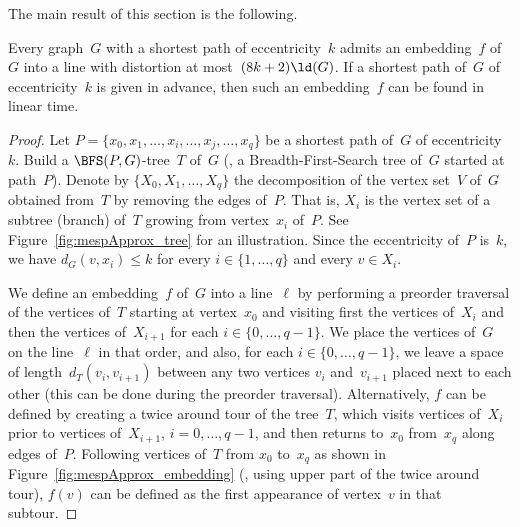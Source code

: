 The main result of this section is the following.

\begin{theorem}
    \label{theo:ldApprox}
Every graph~\( G \) with a shortest path of eccentricity~\( k \) admits an embedding~\( f \) of~\( G \) into a line with distortion at most~\( (8k + 2) \ld(G) \).
If a shortest path of~\( G \) of eccentricity~\( k \) is given in advance, then such an embedding~\( f \) can be found in linear time.
\end{theorem}

\begin{proof}
Let $P = \{ x_0, x_1, \ldots, x_i, \ldots, x_j, \ldots, x_q \}$ be a shortest path of~$G$ of eccentricity~$k$.
Build a $\BFS(P,G)$-tree~$T$ of~$G$ (\ie, a Breadth-First-Search tree of~$G$ started at path~$P$).
Denote by $\{ X_0, X_1, \ldots, X_q \}$ the decomposition of the vertex set~$V$ of~$G$ obtained from~$T$ by removing the edges of~$P$.
That is, $X_i$ is the vertex set of a subtree (branch) of~$T$ growing from vertex~$x_i$ of~$P$.
See Figure~\ref{fig:mespApprox_tree} for an illustration.
Since the eccentricity of~$P$ is~$k$, we have $d_G(v, x_i) \leq k$ for every $i \in \{ 1, \ldots, q \}$ and every $v \in X_i$.

We define an embedding~$f$ of~$G$ into a line~$\ell$ by performing a preorder traversal of the vertices of~$T$ starting at vertex~$x_0$ and visiting first the vertices of~$X_i$ and then the vertices of~$X_{i + 1}$ for each $i \in \{ 0, \ldots, q - 1 \}$.
We place the vertices of~$G$ on the line~$\ell$ in that order, and also, for each $i \in \{ 0, \ldots, q - 1 \}$, we leave a space of length~$d_T(v_i, v_{i+1})$ between any two vertices $v_i$ and~$v_{i+1}$ placed next to each other (this can be done during the preorder traversal).
Alternatively, $f$ can be defined by creating a twice around tour of the tree~$T$, which visits vertices of~$X_i$ prior to vertices of~$X_{i+1}$, $i = 0, \ldots, q - 1$, and then returns to~$x_0$ from~$x_q$ along edges of~$P$.
Following vertices of~$T$ from $x_0$ to~$x_q$ as shown in Figure~\ref{fig:mespApprox_embedding} (\ie, using upper part of the twice around tour), $f(v)$ can be defined as the first appearance of vertex~$v$ in that subtour.


\end{proof}
